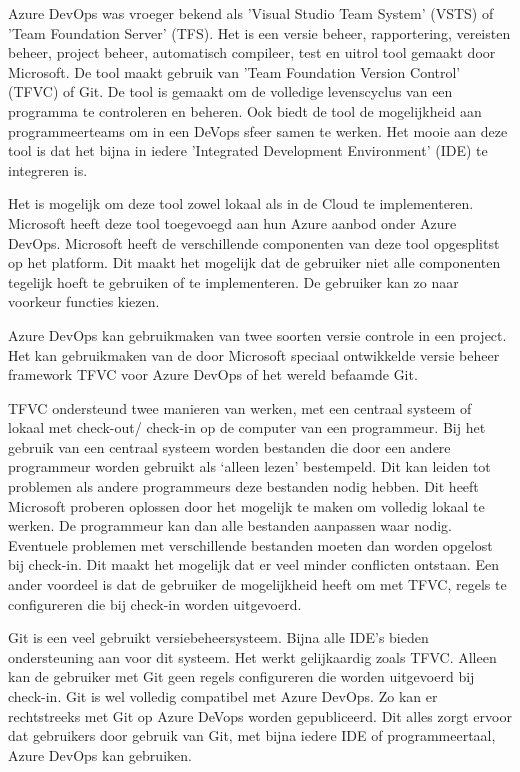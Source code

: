 Azure DevOps was vroeger bekend als 'Visual Studio Team System' (VSTS) of 'Team Foundation Server' (TFS). Het is een versie beheer, rapportering, vereisten beheer, project beheer, automatisch compileer, test en uitrol tool gemaakt door Microsoft. De tool maakt gebruik van 'Team Foundation Version Control' (TFVC) of Git. De tool is gemaakt om de volledige levenscyclus van een programma te controleren en beheren. Ook biedt de tool de mogelijkheid aan programmeerteams om in een DeVops sfeer samen te werken. Het mooie aan deze tool is dat het bijna in iedere 'Integrated Development Environment' (IDE) te integreren is.

Het is mogelijk om deze tool zowel lokaal als in de Cloud te implementeren. Microsoft heeft deze tool toegevoegd aan hun Azure aanbod onder Azure DevOps. Microsoft heeft de verschillende componenten van deze tool opgesplitst op het platform. Dit maakt het mogelijk dat de gebruiker niet alle componenten tegelijk hoeft te gebruiken of te implementeren. De gebruiker kan zo naar  voorkeur functies kiezen.

Azure DevOps kan gebruikmaken van twee soorten versie controle in een project. Het kan gebruikmaken van de door Microsoft speciaal ontwikkelde versie beheer framework TFVC voor Azure DevOps of het wereld befaamde Git. 

TFVC ondersteund twee manieren van werken, met een centraal systeem of lokaal met check-out/ check-in op de computer van een programmeur. Bij het gebruik van een centraal systeem worden bestanden die door een andere programmeur worden gebruikt als ‘alleen lezen’ bestempeld. Dit kan leiden tot problemen als andere programmeurs deze bestanden nodig hebben. Dit heeft Microsoft proberen oplossen door het mogelijk te maken om volledig lokaal te werken. De programmeur kan dan alle bestanden aanpassen waar nodig. Eventuele problemen met verschillende bestanden moeten dan worden opgelost bij check-in. Dit maakt het mogelijk dat er veel minder conflicten ontstaan. Een ander voordeel is dat de gebruiker de mogelijkheid heeft om met TFVC, regels te configureren die bij check-in worden uitgevoerd.

Git is een veel gebruikt versiebeheersysteem. Bijna alle IDE’s bieden ondersteuning aan voor dit systeem. Het werkt gelijkaardig zoals TFVC. Alleen kan de gebruiker met Git geen regels configureren die worden uitgevoerd bij check-in. Git is wel volledig compatibel met Azure DevOps. Zo kan er rechtstreeks met Git op Azure DeVops worden gepubliceerd. Dit alles zorgt ervoor dat gebruikers door gebruik van Git, met bijna iedere IDE of programmeertaal, Azure DevOps kan gebruiken. 

